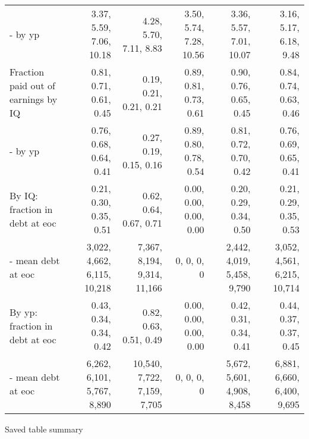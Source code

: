 \begin{tabular}{lrrrrr}
- by yp & 3.37, 5.59, 7.06, 10.18  & 4.28, 5.70, 7.11, 8.83  & 3.50, 5.74, 7.28, 10.56  & 3.36, 5.57, 7.01, 10.07  & 3.16, 5.17, 6.18, 9.48  \\
Fraction paid out of earnings by IQ & 0.81, 0.71, 0.61, 0.45  & 0.19, 0.21, 0.21, 0.21  & 0.89, 0.81, 0.73, 0.61  & 0.90, 0.76, 0.65, 0.45  & 0.84, 0.74, 0.63, 0.46  \\
- by yp & 0.76, 0.68, 0.64, 0.41  & 0.27, 0.19, 0.15, 0.16  & 0.89, 0.80, 0.78, 0.54  & 0.81, 0.72, 0.70, 0.42  & 0.76, 0.69, 0.65, 0.41  \\
By IQ: fraction in debt at eoc & 0.21, 0.30, 0.35, 0.51  & 0.62, 0.64, 0.67, 0.71  & 0.00, 0.00, 0.00, 0.00  & 0.20, 0.29, 0.34, 0.50  & 0.21, 0.29, 0.35, 0.53  \\
- mean debt at eoc & 3,022, 4,662, 6,115, 10,218  & 7,367, 8,194, 9,314, 11,166  & 0, 0, 0, 0  & 2,442, 4,019, 5,458, 9,790  & 3,052, 4,561, 6,215, 10,714  \\
By yp: fraction in debt at eoc & 0.43, 0.34, 0.34, 0.42  & 0.82, 0.63, 0.51, 0.49  & 0.00, 0.00, 0.00, 0.00  & 0.42, 0.31, 0.34, 0.41  & 0.44, 0.37, 0.37, 0.45  \\
- mean debt at eoc & 6,262, 6,101, 5,767, 8,890  & 10,540, 7,722, 7,159, 7,705  & 0, 0, 0, 0  & 5,672, 5,601, 4,908, 8,458  & 6,881, 6,660, 6,400, 9,695  \\
\hline
\end{tabular}%
Saved table summary

